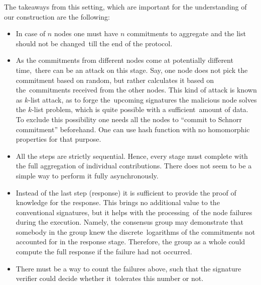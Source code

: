 The takeaways from this setting, which are important for the understanding of our construction are the following:
\begin{itemize}
    \item In case of $n$ nodes one must have $n$ commitments to aggregate and the list should not be changed\
    till the end of the protocol.
    \item As the commitments from different nodes come at potentially different time,\
    there can be an attack on this stage.
    Say, one node does not pick the commitment based on random, but rather calculates it based on the\
    commitments received from the other nodes.
    This kind of attack is known as $k$-list attack, as to forge the\
    upcoming signatures the malicious node solves the $k$-list problem, which is quite possible with a sufficient\
    amount of data.
    To exclude this possibility one needs all the nodes to \enquote{commit to Schnorr commitment} beforehand.
    One can use hash function with no homomorphic properties for that purpose.
    \item All the steps are strictly sequential.
    Hence, every stage must complete with the full aggregation of
    individual contributions.
    There does not seem to be a simple way to perform it fully asynchronously.
    \item Instead of the last step (response) it is sufficient to provide the proof of knowledge for the response.
    This brings no additional value to the conventional signatures, but it helps with the processing\
    of the node failures during the execution.
    Namely, the consensus group may demonstrate that somebody in the group knew the discrete\
    logarithms of the commitments not accounted for in the response stage.
    Therefore, the group as a whole could
    compute the full response if the failure had not occurred.
    \item There must be a way to count the failures above, such that the signature verifier could decide whether it\
    tolerates this number or not.
\end{itemize}

